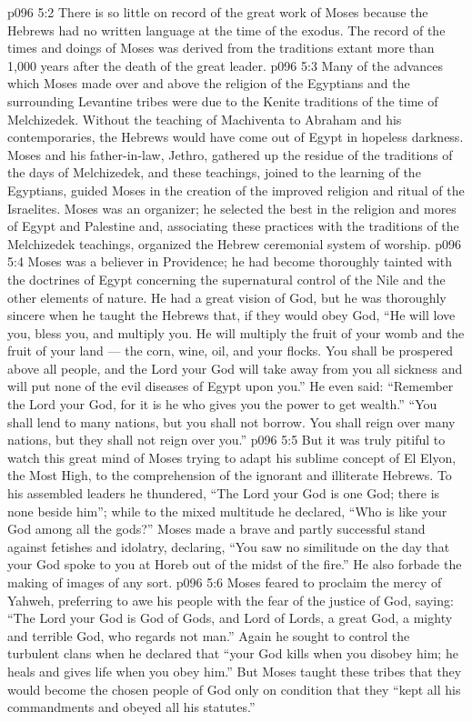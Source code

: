 \vs p096 5:2 There is so little on record of the great work of Moses because the Hebrews had no written language at the time of the exodus. The record of the times and doings of Moses was derived from the traditions extant more than 1,000 years after the death of the great leader.
\vs p096 5:3 Many of the advances which Moses made over and above the religion of the Egyptians and the surrounding Levantine tribes were due to the Kenite traditions of the time of Melchizedek. Without the teaching of Machiventa to Abraham and his contemporaries, the Hebrews would have come out of Egypt in hopeless darkness. Moses and his father\hyp{}in\hyp{}law, Jethro, gathered up the residue of the traditions of the days of Melchizedek, and these teachings, joined to the learning of the Egyptians, guided Moses in the creation of the improved religion and ritual of the Israelites. Moses was an organizer; he selected the best in the religion and mores of Egypt and Palestine and, associating these practices with the traditions of the Melchizedek teachings, organized the Hebrew ceremonial system of worship.
\vs p096 5:4 \pc Moses was a believer in Providence; he had become thoroughly tainted with the doctrines of Egypt concerning the supernatural control of the Nile and the other elements of nature. He had a great vision of God, but he was thoroughly sincere when he taught the Hebrews that, if they would obey God, “He will love you, bless you, and multiply you. He will multiply the fruit of your womb and the fruit of your land --- the corn, wine, oil, and your flocks. You shall be prospered above all people, and the Lord your God will take away from you all sickness and will put none of the evil diseases of Egypt upon you.” He even said: “Remember the Lord your God, for it is he who gives you the power to get wealth.” “You shall lend to many nations, but you shall not borrow. You shall reign over many nations, but they shall not reign over you.”
\vs p096 5:5 \pc But it was truly pitiful to watch this great mind of Moses trying to adapt his sublime concept of El Elyon, the Most High, to the comprehension of the ignorant and illiterate Hebrews. To his assembled leaders he thundered, “The Lord your God is one God; there is none beside him”; while to the mixed multitude he declared, “Who is like your God among all the gods?” Moses made a brave and partly successful stand against fetishes and idolatry, declaring, “You saw no similitude on the day that your God spoke to you at Horeb out of the midst of the fire.” He also forbade the making of images of any sort.
\vs p096 5:6 Moses feared to proclaim the mercy of Yahweh, preferring to awe his people with the fear of the justice of God, saying: “The Lord your God is God of Gods, and Lord of Lords, a great God, a mighty and terrible God, who regards not man.” Again he sought to control the turbulent clans when he declared that “your God kills when you disobey him; he heals and gives life when you obey him.” But Moses taught these tribes that they would become the chosen people of God only on condition that they “kept all his commandments and obeyed all his statutes.”
